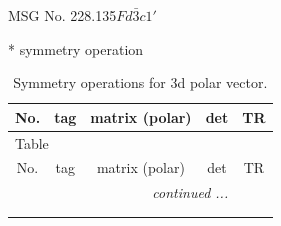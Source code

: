 \documentclass[fleqn,8pt]{jsarticle}
\begin{document}
\setcounter{MaxMatrixCols}{32}

\renewcommand{\tablename}{Table~}
\renewcommand{\figurename}{Figure~}
\begin{center}
\LARGE
MSG No. 228.135\quad$Fd\bar{3}c1'$
\end{center}
* symmetry operation
\renewcommand{\arraystretch}{1.3}
\begin{longtable}{ccccc}
\caption{Symmetry operations for 3d polar vector.}
 \\
 \hline \hline
No. & tag & matrix (polar) & det & TR \\ \hline \endfirsthead

\multicolumn{4}{l}{\tablename\ \thetable{}} \\
 \hline \hline
No. & tag & matrix (polar) & det & TR \\ \hline \endhead

 \hline \hline
\multicolumn{4}{r}{\footnotesize\it continued ...} \\ \endfoot

 \hline \hline
\multicolumn{4}{r}{} \\ \endlastfoot


\end{longtable}
\end{document}
